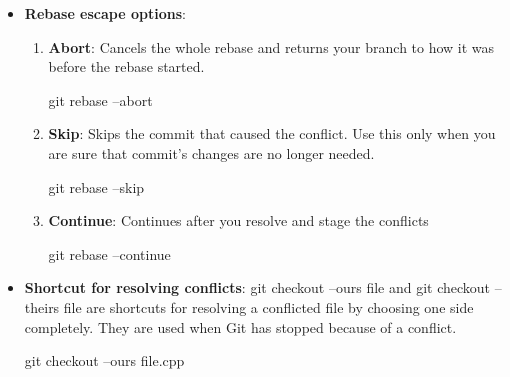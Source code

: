 \documentclass{report}
\begin{document}
\begin{itemize}
\begin{itemize}
                    \bigbreak \noindent 
                    \begin{bashcode}
                        git rebase --continue
                    \end{bashcode}
                    \bigbreak \noindent 
                    Git will then try to replay the next commit. If another conflict occurs, repeat the same process.
                \item \textbf{Rebase escape options}:
                    \begin{enumerate}
                        \item \textbf{Abort}: Cancels the whole rebase and returns your branch to how it was before the rebase started.
                            \bigbreak \noindent 
                            \begin{bashcode}
                                git rebase --abort
                            \end{bashcode}
                        \item \textbf{Skip}:  Skips the commit that caused the conflict. Use this only when you are sure that commit’s changes are no longer needed.
                            \bigbreak \noindent 
                            \begin{bashcode}
                                git rebase --skip
                            \end{bashcode}
                        \item \textbf{Continue}: Continues after you resolve and stage the conflicts
                            \bigbreak \noindent 
                            \begin{bashcode}
                                git rebase --continue
                            \end{bashcode}
                    \end{enumerate}
                \item \textbf{Shortcut for resolving conflicts}: git checkout --ours file and git checkout --theirs file are shortcuts for resolving a conflicted file by choosing one side completely.
                    \bigbreak \noindent 
                    They are used when Git has stopped because of a conflict.
                    \bigbreak \noindent 
                    \begin{bashcode}
                        git checkout --ours file.cpp
                    \end{bashcode}
                    \bigbreak \noindent 

\end{itemize}
\end{itemize}
\end{document}
